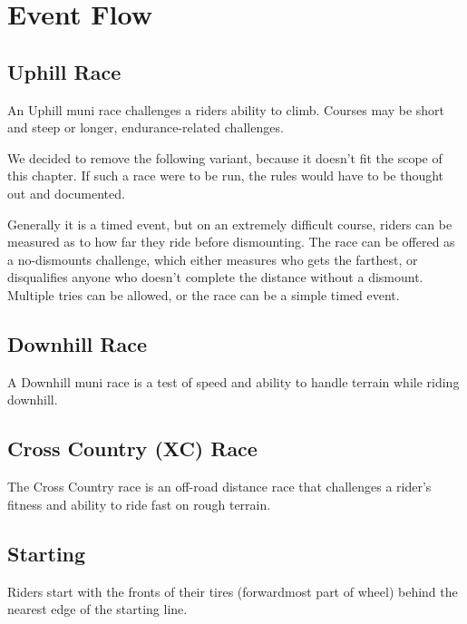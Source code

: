 \section{Event Flow}

\subsection{Uphill Race \label{sec:muni_uphill}}

An Uphill muni race challenges a riders ability to climb.
Courses may be short and steep or longer, endurance-related challenges.

\begin{comment2016}
We decided to remove the following variant, because it doesn't fit the scope of this chapter.
If such a race were to be run, the rules would have to be thought out and documented.

Generally it is a timed event, but on an extremely difficult course, riders can be measured as to how far they ride before dismounting.
The race can be offered as a no-dismounts challenge, which either measures who gets the farthest, or disqualifies anyone who doesn't complete the distance without a dismount.
Multiple tries can be allowed, or the race can be a simple timed event.
\end{comment2016}

\subsection{Downhill Race \label{sec:muni_downhill}}

A Downhill muni race is a test of speed and ability to handle terrain while riding downhill.

\subsection{Cross Country (XC) Race\label{sec:muni_xc}}

The Cross Country race is an off-road distance race that challenges a rider's fitness and ability to ride fast on rough terrain.

\subsection{Starting}

Riders start with the fronts of their tires (forwardmost part of wheel) behind the nearest edge of the starting line.

